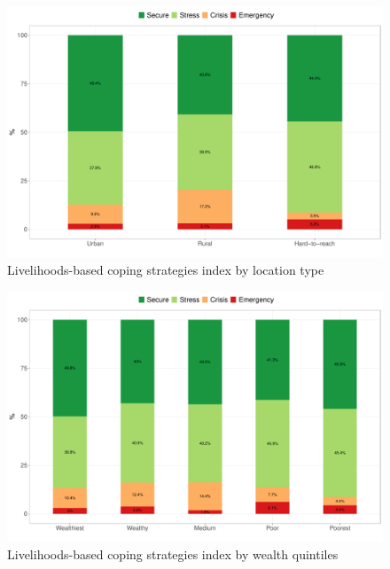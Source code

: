 \documentclass[12pt,a4paper]{article}
\begin{document}
\newpage

\begin{figure}[H]

{\centering \includegraphics{kayahReport_files/figure-latex/lcsi1plot-1} 

}

\caption{Livelihoods-based coping strategies index by location type}\label{fig:lcsi1plot}
\end{figure}

\begin{figure}[H]

{\centering \includegraphics{kayahReport_files/figure-latex/lcsi2plot-1} 

}

\caption{Livelihoods-based coping strategies index by wealth quintiles}\label{fig:lcsi2plot}
\end{figure}
\end{document}
